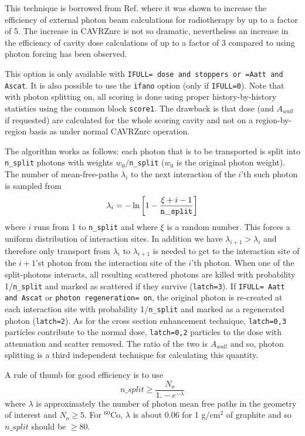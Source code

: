 \documentclass[12pt,twoside]{article}  %
\newcommand{\eqn}[1]{\begin{equation} #1 \end{equation} }
\begin{document}
This technique is borrowed from Ref. \cite{KF99} where it was shown
to increase the efficiency of external photon beam calculations for
radiotherapy by up to a factor of 5. The increase in CAVRZnrc is
not so dramatic, nevertheless an increase in the efficiency
of cavity dose calculations of up to a factor of 3 compared to using photon
forcing has been observed.

This option is only available with {\tt IFULL= dose and stoppers or =Aatt and Ascat}.
It is also possible to use the {\tt ifano} option (only
if {\tt IFULL=0}). Note that with photon splitting
on, all scoring
is done using proper history-by-history statistics using
the common block {\tt score1}.  The drawback is that dose
(and $A_{wall}$ if requested) are calculated for the whole scoring cavity and
not on a region-by-region basis as under normal CAVRZnrc operation.

The algorithm works as follows:
each photon that is to be transported is split into
{\tt n\_split} photons with weights $w_0/${\tt n\_split}
($w_0$ is the original photon weight). The number of
mean-free-paths $\lambda_i$ to the next interaction of the $i$'th
such photon is sampled from
\begin{equation}
\lambda_i = -\ln \left[1 - {\xi + i - 1 \over {\tt n\_split} } \right]
\end{equation}
where $i$ runs from 1 to {\tt n\_split} and where $\xi$ is a random
number. This forces a uniform distribution of interaction sites.
In addition we have $\lambda_{i+1} > \lambda_i$ and therefore
only transport from $\lambda_i$ to $\lambda_{i+1}$ is needed to
get to the interaction site of the $i+1$'st photon from the
interaction site of the $i$'th photon. When one of the split-photons
interacts, all resulting scattered photons are killed with probability
1/{\tt n\_split} and marked as scattered if they survive
({\tt latch=3}). If {\tt IFULL= Aatt and Ascat} or {\tt photon
regeneration= on}, the original photon is
re-created at each interaction site with probability
1/{\tt n\_split} and marked as a regenerated photon ({\tt latch=2}).
As for the cross section enhancement technique, {\tt latch=0,3} particles
contribute to the normal dose, {\tt latch=0,2} particles to the dose
with attenuation and scatter removed. The ratio of the two is
$A_{wall}$ and so, photon splitting is a third independent
technique for calculating this quantity.

A rule of thumb for good efficiency is to use
\eqn{n\_split \ge \frac{N_o}{1. - e^{-\lambda}} }
where $\lambda$ is approximately the number of photon mean free paths in the
geometry of interest and $N_o \ge 5$. For $^{60}$Co, $\lambda$ is about
0.06 for 1 g/cm$^2$ of graphite and so $n\_split$ should be $\ge 80$.
\end{document}

